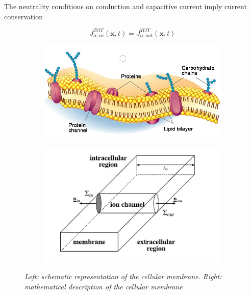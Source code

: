 \documentclass[a4paper]{article}
\begin{document}
The neutrality conditions on conduction and capacitive current imply current conservation 

\begin{equation}
J_{\alpha,in}^{TOT}(\textbf{x},t) = J_{\alpha,out}^{TOT}(\textbf{x},t)
\end{equation}








\begin{figure}[H]
	\begin{minipage}{\linewidth}
		\centering
		\begin{minipage}{0.45\linewidth}
			\begin{figure}[H]
				\includegraphics[width=\linewidth]{membrane.jpg}
				
			\end{figure}
		\end{minipage}
		\hspace{0.05\linewidth}
		\begin{minipage}{0.45\linewidth}
			\begin{figure}[H]
				\includegraphics[width=\linewidth]{intra.png}
				
			\end{figure}
		\end{minipage}
		
	\end{minipage}
	\caption{\textit{Left: schematic representation of the cellular membrane.
			Right: mathematical description of the cellular membrane}}
\end{figure}
\end{document}
